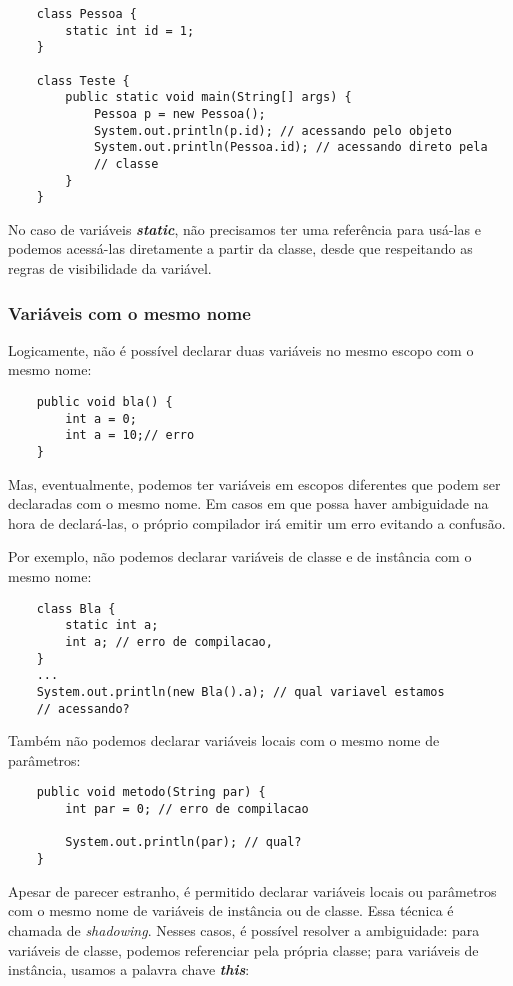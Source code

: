 \documentclass[12pt]{article}
\begin{document}
\begin{lstlisting}
	class Pessoa {
		static int id = 1;
	}
	
	class Teste {
		public static void main(String[] args) {
			Pessoa p = new Pessoa();
			System.out.println(p.id); // acessando pelo objeto
			System.out.println(Pessoa.id); // acessando direto pela
			// classe
		}
	}
\end{lstlisting}

No caso de variáveis \textbf{\textit{static}}, não precisamos ter uma referência para usá-las e podemos acessá-las diretamente a partir da classe, desde que respeitando as regras de visibilidade da variável.

\subsubsection{Variáveis com o mesmo nome}

Logicamente, não é possível declarar duas variáveis no mesmo escopo com o mesmo nome:

\begin{lstlisting}
	public void bla() {
		int a = 0;
		int a = 10;// erro
	}
\end{lstlisting}

Mas, eventualmente, podemos ter variáveis em escopos diferentes que podem ser declaradas com o mesmo nome. Em casos em que possa haver ambiguidade na hora de declará-las, o próprio compilador irá emitir um erro evitando a confusão.
\pagebreak

Por exemplo, não podemos declarar variáveis de classe e de instância com o mesmo nome:

\begin{lstlisting}
	class Bla {
		static int a;
		int a; // erro de compilacao,
	}
	...
	System.out.println(new Bla().a); // qual variavel estamos
	// acessando?
\end{lstlisting}

Também não podemos declarar variáveis locais com o mesmo nome de parâmetros:

\begin{lstlisting}
	public void metodo(String par) {
		int par = 0; // erro de compilacao
		
		System.out.println(par); // qual?
	}
\end{lstlisting}

Apesar de parecer estranho, é permitido declarar variáveis locais ou parâmetros com o mesmo nome de variáveis de instância ou de classe. Essa técnica é chamada de \textit{shadowing}. Nesses casos, é possível resolver a ambiguidade: para variáveis de classe, podemos referenciar pela própria classe; para variáveis de instância, usamos a palavra chave \textbf{\textit{this}}:
\end{document}
